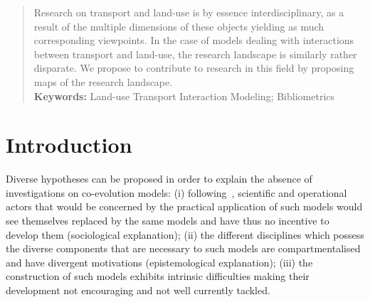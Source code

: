 \documentclass[10pt]{article}
\title{}
\author{Juste Raimbault$^{1,2,3,\ast}$\medskip\\
$^{1}$ Center for Advanced Spatial Analysis, University College London\\
$^{2}$ UPS CNRS 3611 ISC-PIF\\
$^{3}$ UMR CNRS 8504 G{\'e}ographie-cit{\'e}s\medskip\\
$^{\ast}$ \texttt{juste.raimbault@polytechnique.edu}
}
\date{} %
\begin{document}
\maketitle
\begin{abstract}
Research on transport and land-use is by essence interdisciplinary, as a result of the multiple dimensions of these objects yielding as much corresponding viewpoints. In the case of models dealing with interactions between transport and land-use, the research landscape is similarly rather disparate. We propose to contribute to research in this field by proposing maps of the research landscape.\\\medskip
\textbf{Keywords: } Land-use Transport Interaction Modeling; Bibliometrics
\end{abstract}





\section{Introduction}



Diverse hypotheses can be proposed in order to explain the absence of investigations on co-evolution models: (i) following~\cite{commenges:tel-00923682}, scientific and operational actors that would be concerned by the practical application of such models would see themselves replaced by the same models and have thus no incentive to develop them (sociological explanation); (ii) the different disciplines which possess the diverse components that are necessary to such models are compartmentalised and have divergent motivations (epistemological explanation); (iii) the construction of such models exhibits intrinsic difficulties making their development not encouraging and not well currently tackled.

\end{document}
